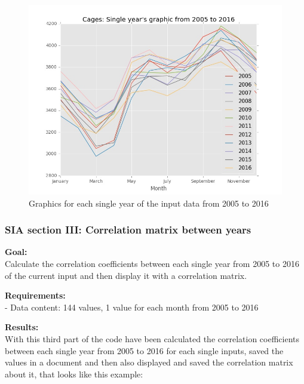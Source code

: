 \begin{figure}[H]
	\centering
    \includegraphics[width=1\textwidth]{Files/Cages_Years.jpg}
    \caption{Graphics for each single year of the input data from 2005 to 2016}
\end{figure}




\newpage
\subsubsection{SIA section III: Correlation matrix between years}

\textbf{Goal:}\\
Calculate the correlation coefficients between each single year from 2005 to 2016 of the current input and then display it with a correlation matrix.

\textbf{Requirements:}\\
- Data content: 144 values, 1 value for each month from 2005 to 2016



\textbf{Results:} \\
With this third part of the code have been calculated the correlation coefficients between each single year from 2005 to 2016 for each single inputs, saved the values in a document and then also displayed and saved the correlation matrix about it, that looks like this example:

